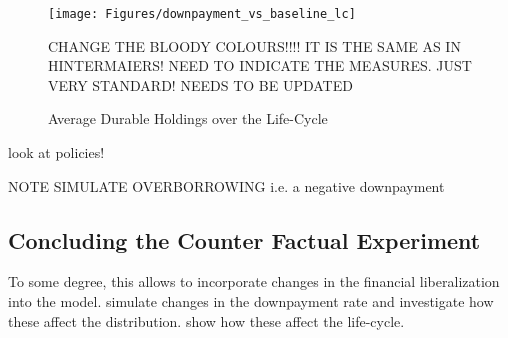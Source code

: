 \documentclass[a4paper,12pt,legno]{article}
\begin{document}
\begin{figure}[!htbp]
\caption{Average Durable Holdings over the Life-Cycle} 
\label{downpayment_vs_baseline_lc}	%
\centering
\texttt{[image: Figures/downpayment\_vs\_baseline\_lc]}  %

\begin{minipage}{0.8\linewidth}
\footnotesize{CHANGE THE BLOODY COLOURS!!!! IT IS THE SAME AS IN HINTERMAIERS! NEED TO INDICATE THE MEASURES. JUST VERY STANDARD! NEEDS TO BE UPDATED}
\end{minipage}

\end{figure}


look at policies! 

NOTE SIMULATE OVERBORROWING i.e. a negative downpayment

\subsection{Concluding the Counter Factual Experiment}
To some degree, this allows to incorporate changes in the financial liberalization into the model. \cite{diaz2010} simulate changes in the downpayment rate and investigate how these affect the distribution. \cite{yang2009} show how these affect the life-cycle.
\end{document}
